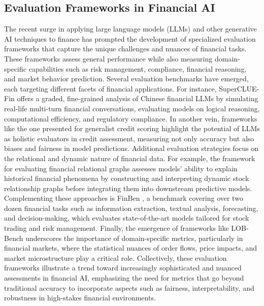 \subsection{Evaluation Frameworks in Financial AI}

The recent surge in applying large language models (LLMs) and other generative AI techniques to finance has prompted the development of specialized evaluation frameworks that capture the unique challenges and nuances of financial tasks. These frameworks assess general performance while also measuring domain-specific capabilities such as risk management, compliance, financial reasoning, and market behavior prediction. Several evaluation benchmarks have emerged, each targeting different facets of financial applications. For instance, SuperCLUE-Fin \cite{xu2024supercluefingradedfinegrainedanalysis} offers a graded, fine-grained analysis of Chinese financial LLMs by simulating real-life multi-turn financial conversations, evaluating models on logical reasoning, computational efficiency, and regulatory compliance. In another vein, frameworks like the one presented for generalist credit scoring \cite{feng2024empoweringmanybiasingfew} highlight the potential of LLMs as holistic evaluators in credit assessment, measuring not only accuracy but also biases and fairness in model predictions. Additional evaluation strategies focus on the relational and dynamic nature of financial data. For example, the framework for evaluating financial relational graphs \cite{niu2024evaluatingfinancialrelationalgraphs} assesses models' ability to explain historical financial phenomena by constructing and interpreting dynamic stock relationship graphs before integrating them into downstream predictive models. Complementing these approaches is FinBen \cite{xie2024finbenaholisticfinancialbenchmark}, a benchmark covering over two dozen financial tasks such as information extraction, textual analysis, forecasting, and decision-making, which evaluates state-of-the-art models tailored for stock trading and risk management. Finally, the emergence of frameworks like LOB-Bench \cite{nagy2025lobbenchbenchmarkinggenerativeai} underscores the importance of domain-specific metrics, particularly in financial markets, where the statistical nuances of order flows, price impacts, and market microstructure play a critical role. Collectively, these evaluation frameworks illustrate a trend toward increasingly sophisticated and nuanced assessments in financial AI, emphasizing the need for metrics that go beyond traditional accuracy to incorporate aspects such as fairness, interpretability, and robustness in high-stakes financial environments.

